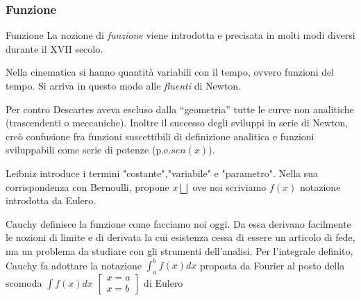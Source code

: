 \begin{frame}[label=Funzione]
  \frametitle{Funzione}
  \begin{block}{Funzione}    
  La nozione di \textit{funzione} viene introdotta e precisata in molti modi diversi
  durante il XVII secolo.

  Nella cinematica si hanno quantità variabili con il tempo, ovvero funzioni del tempo. 
  Si arriva in questo modo alle \textit{fluenti} di Newton.

  Per contro Descartes aveva escluso dalla ``geometria'' tutte le curve non analitiche (trascendenti o meccaniche).
  Inoltre il successo degli sviluppi in serie di Newton, creò confusione fra funzioni
  suscettibili di definizione analitica e funzioni sviluppabili come serie di potenze (p.e.$sen(x)$).  
  
  Leibniz introduce i termini "costante","variabile" e "parametro".
  Nella sua corrispondenza con Bernoulli, propone $x\bigsqcup$ ove noi scriviamo $f(x)$ notazione introdotta da Eulero.
  
  Cauchy definisce la funzione come facciamo noi oggi. Da essa derivano facilmente le nozioni di limite e di derivata la cui
  esistenza cessa di essere un articolo di fede, ma un problema da studiare con
  gli strumenti dell'analisi.
  Per l'integrale definito, Cauchy fa adottare la notazione $\int_{a}^bf(x)dx$ proposta da Fourier
  al posto della scomoda $\int f(x)dx$ $\left[\begin{array}{c} x=a \\ x=b \end{array}\right] $ di Eulero
  \end{block}  
\end{frame}